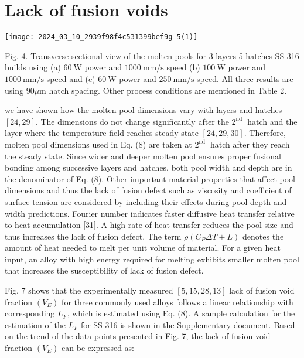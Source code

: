 \documentclass[10pt]{article}
\begin{document}
\section*{Lack of fusion voids}
\begin{center}
\texttt{[image: 2024\_03\_10\_2939f98f4c531399bef9g-5(1)]}
\end{center}

Fig. 4. Transverse sectional view of the molten pools for 3 layers 5 hatches SS 316 builds using (a) $60 \mathrm{~W}$ power and $1000 \mathrm{~mm} / \mathrm{s}$ speed (b) $100 \mathrm{~W}$ power and $1000 \mathrm{~mm} / \mathrm{s}$ speed and (c) $60 \mathrm{~W}$ power and $250 \mathrm{~mm} / \mathrm{s}$ speed. All three results are using $90 \mu \mathrm{m}$ hatch spacing. Other process conditions are mentioned in Table 2.

we have shown how the molten pool dimensions vary with layers and hatches $[24,29]$. The dimensions do not change significantly after the $2^{\text {nd }}$ hatch and the layer where the temperature field reaches steady state $[24,29,30]$. Therefore, molten pool dimensions used in Eq. (8) are taken at $2^{\text {nd }}$ hatch after they reach the steady state. Since wider and deeper molten pool ensures proper fusional bonding among successive layers and hatches, both pool width and depth are in the denominator of Eq. (8). Other important material properties that affect pool dimensions and thus the lack of fusion defect such as viscosity and coefficient of surface tension are considered by including their effects during pool depth and width predictions. Fourier number indicates faster diffusive heat transfer relative to heat accumulation [31]. A high rate of heat transfer reduces the pool size and thus increases the lack of fusion defect. The term $\rho\left(C_{P} \Delta T+L\right)$ denotes the amount of heat needed to melt per unit volume of material. For a given heat input, an alloy with high energy required for melting exhibits smaller molten pool that increases the susceptibility of lack of fusion defect.

Fig. 7 shows that the experimentally measured $[5,15,28,13]$ lack of fusion void fraction $\left(V_{E}\right)$ for three commonly used alloys follows a linear relationship with corresponding $L_{F}$, which is estimated using Eq. (8). A sample calculation for the estimation of the $L_{F}$ for SS 316 is shown in the Supplementary document. Based on the trend of the data points presented in Fig. 7, the lack of fusion void fraction $\left(V_{E}\right)$ can be expressed as:
\end{document}
